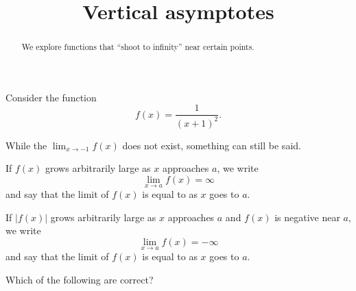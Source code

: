 \documentclass{ximera}
\title[Dig-In:]{Vertical asymptotes}
\begin{document}
\begin{abstract}
We explore functions that ``shoot to infinity'' near certain points.

\end{abstract}
\maketitle

Consider the function
\[
f(x) = \frac{1}{(x+1)^2}.
\]
\begin{image}
\end{image}
While the $\lim_{x\to -1} f(x)$ does not exist, something can still be
said.

\begin{definition}\label{def:inflimit}
	If $f(x)$ grows arbitrarily large as $x$ approaches $a$, we write
	\[ \lim_{x\to a} f(x) = \infty \]
	and say that the limit of $f(x)$ is equal to  as $x$ goes to $a$.

	If $|f(x)|$ grows arbitrarily large as $x$ approaches $a$ and $f(x)$ is
	negative near $a$, we write
	\[ \lim_{x\to a} f(x) = -\infty \]
	and say that the limit of $f(x)$ is equal to  as $x$ goes to $a$.
\end{definition}

\begin{question}
  Which of the following are correct?
  \begin{selectAll}
  \end{selectAll}
\end{question}
\end{document}
